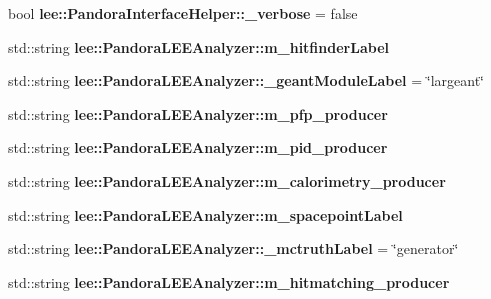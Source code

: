 \begin{DoxyCompactItemize}
\item 
\hypertarget{group__lee_ga39213dbd10338e8fefb3b6756f2e9cb3}{bool {\bfseries lee\-::\-Pandora\-Interface\-Helper\-::\-\_\-verbose} = false}\label{group__lee_ga39213dbd10338e8fefb3b6756f2e9cb3}

\item 
\hypertarget{group__lee_gaf8a8c564772112b2c47945afcf674484}{std\-::string {\bfseries lee\-::\-Pandora\-L\-E\-E\-Analyzer\-::m\-\_\-hitfinder\-Label}}\label{group__lee_gaf8a8c564772112b2c47945afcf674484}

\item 
\hypertarget{group__lee_gaf68d4bc3b81df418e7925567e36e5996}{std\-::string {\bfseries lee\-::\-Pandora\-L\-E\-E\-Analyzer\-::\-\_\-geant\-Module\-Label} = \char`\"{}largeant\char`\"{}}\label{group__lee_gaf68d4bc3b81df418e7925567e36e5996}

\item 
\hypertarget{group__lee_ga4d931b0979f37341d7097520d6cb103d}{std\-::string {\bfseries lee\-::\-Pandora\-L\-E\-E\-Analyzer\-::m\-\_\-pfp\-\_\-producer}}\label{group__lee_ga4d931b0979f37341d7097520d6cb103d}

\item 
\hypertarget{group__lee_gac5fa9ebd50776233ccfbf82f5886411f}{std\-::string {\bfseries lee\-::\-Pandora\-L\-E\-E\-Analyzer\-::m\-\_\-pid\-\_\-producer}}\label{group__lee_gac5fa9ebd50776233ccfbf82f5886411f}

\item 
\hypertarget{group__lee_ga11a0a8879de1549d48e9fdfab8fc9365}{std\-::string {\bfseries lee\-::\-Pandora\-L\-E\-E\-Analyzer\-::m\-\_\-calorimetry\-\_\-producer}}\label{group__lee_ga11a0a8879de1549d48e9fdfab8fc9365}

\item 
\hypertarget{group__lee_ga7a5ae683e3f2b04f71812b689cd08b76}{std\-::string {\bfseries lee\-::\-Pandora\-L\-E\-E\-Analyzer\-::m\-\_\-spacepoint\-Label}}\label{group__lee_ga7a5ae683e3f2b04f71812b689cd08b76}

\item 
\hypertarget{group__lee_ga462f214c8a7ede15d53754c120f54d45}{std\-::string {\bfseries lee\-::\-Pandora\-L\-E\-E\-Analyzer\-::\-\_\-mctruth\-Label} = \char`\"{}generator\char`\"{}}\label{group__lee_ga462f214c8a7ede15d53754c120f54d45}

\item 
\hypertarget{group__lee_gafeca3ce0e272568cc6a1dbec12e87736}{std\-::string {\bfseries lee\-::\-Pandora\-L\-E\-E\-Analyzer\-::m\-\_\-hitmatching\-\_\-producer}}\label{group__lee_gafeca3ce0e272568cc6a1dbec12e87736}


\end{DoxyCompactItemize}
